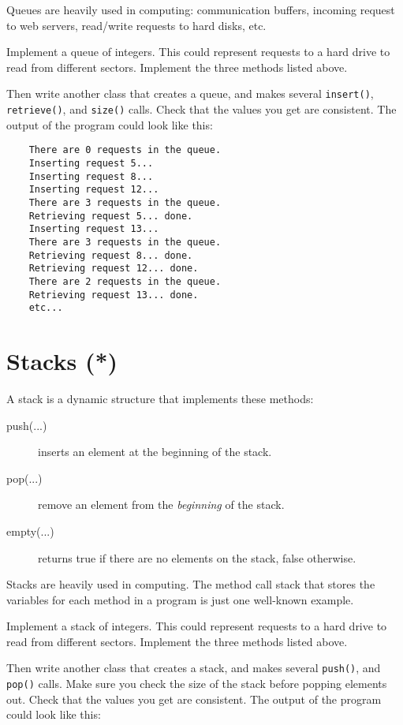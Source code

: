\documentclass{article}
\begin{document}
Queues are heavily used in computing: communication
buffers, incoming request to web servers, read/write requests to hard
disks, etc. 

Implement a queue of integers. This could represent requests
to a hard drive to read from different sectors. Implement the three
methods listed above. 

Then write another class that creates a queue, and makes several
\verb+insert()+, \verb+retrieve()+, and \verb+size()+ calls. Check
that the values you get are consistent. The output of the program
could look like this: 

\begin{verbatim}
    There are 0 requests in the queue.
    Inserting request 5...
    Inserting request 8...
    Inserting request 12...
    There are 3 requests in the queue.
    Retrieving request 5... done. 
    Inserting request 13...
    There are 3 requests in the queue.
    Retrieving request 8... done. 
    Retrieving request 12... done. 
    There are 2 requests in the queue.
    Retrieving request 13... done. 
    etc...
\end{verbatim}

\section{Stacks (*)}
\label{sec:stack}

A stack is a dynamic structure that implements these methods: 

\begin{description}
\item[push(...)] inserts an element at the beginning of the stack.
\item[pop(...) ] remove an element from the \emph{beginning} of the stack.
\item[empty(...) ] returns true if there are no elements on the stack,
  false otherwise.
\end{description}

Stacks are heavily used in computing. The method call stack that
stores the variables for each method in a program is just one
well-known example. 

Implement a stack of integers. This could represent requests
to a hard drive to read from different sectors. Implement the three
methods listed above. 

Then write another class that creates a stack, and makes several
\verb+push()+, and \verb+pop()+ calls. Make sure you check the size of
the stack before popping elements out. Check
that the values you get are consistent. The output of the program
could look like this: 
\end{document}
